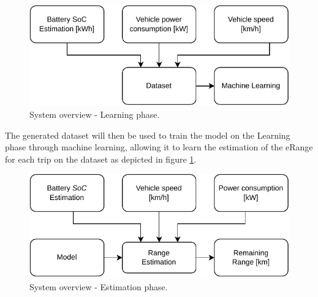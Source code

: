 \begin{figure}[H]
    \begin{center}
        \includegraphics[scale=1.0]{../figures/generic_diagram_learn_phase}
        \caption{System overview - Learning phase.}
        \label{fig:generic_diagram_learn_phase}
    \end{center}
\end{figure}

The generated \gls{dataset} will then be used to train
the model on the Learning phase through machine learning, 
allowing it to learn the estimation of 
the \gls{eRange} for each trip on the \gls{dataset}
as depicted in figure \ref{fig:generic_diagram_learn_phase}.


\begin{figure}[H]
    \begin{center}
        \includegraphics[scale=1.0]{../figures/generic_diagram_estimation_phase}
        \caption{System overview - Estimation phase.}
        \label{fig:generic_diagram_estimation_phase}
    \end{center}
\end{figure}

